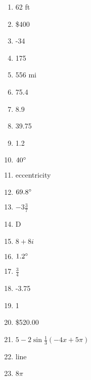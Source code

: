 \documentclass[../uilmath.tex]{subfiles}
\begin{document}
\begin{enumerate}[label=\bfseries\arabic*.]
    \item %
    62 ft
    
    \item %
    \$400

    \item %
    -34

    \item %
    175

    \item %
    556 mi 

    \item %
    75.4

    \item %
    8.9

    \item %
    39.75

    \item %
    1.2

    \item %
    $40\degree$

    \item %
    eccentricity

    \item %
    $69.8\degree$

    \item %
    $-3 \frac{3}{7}$

    \item %
    D 

    \item %
    $8+8i$

    \item %
    $1.2\degree$

    \item %
    $\frac{3}{4}$

    \item %
    -3.75

    \item %
    1

    \item %
    \$520.00

    \item %
    $5-2\sin\frac{1}{3}(-4x+5\pi)$

    \item %
    line
    
    \item %
    $8\pi$


\end{enumerate}
\end{document}
